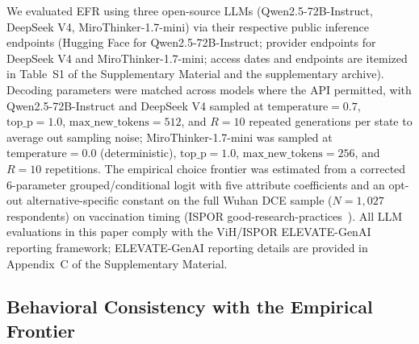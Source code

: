 \documentclass[11pt]{article}
\begin{document}
We evaluated EFR using three open-source LLMs (Qwen2.5-72B-Instruct, DeepSeek V4, MiroThinker-1.7-mini) via their respective public inference endpoints (Hugging Face for Qwen2.5-72B-Instruct; provider endpoints for DeepSeek V4 and MiroThinker-1.7-mini; access dates and endpoints are itemized in Table~S1 of the Supplementary Material and the supplementary archive). Decoding parameters were matched across models where the API permitted, with Qwen2.5-72B-Instruct and DeepSeek V4 sampled at $\mathrm{temperature}=0.7$, $\mathrm{top\_p}=1.0$, $\mathrm{max\_new\_tokens}=512$, and $R=10$ repeated generations per state to average out sampling noise; MiroThinker-1.7-mini was sampled at $\mathrm{temperature}=0.0$ (deterministic), $\mathrm{top\_p}=1.0$, $\mathrm{max\_new\_tokens}=256$, and $R=10$ repetitions. The empirical choice frontier was estimated from a corrected 6-parameter grouped/conditional logit with five attribute coefficients and an opt-out alternative-specific constant on the full Wuhan DCE sample ($N=1{,}027$ respondents) on vaccination timing (ISPOR good-research-practices~\citep{Johnson2013DCE,Hauber2016DCE}). All LLM evaluations in this paper comply with the ViH/ISPOR ELEVATE-GenAI reporting framework; ELEVATE-GenAI reporting details are provided in Appendix~C of the Supplementary Material.

\subsection{Behavioral Consistency with the Empirical Frontier}
\label{sec:behavioral_consistency}
\end{document}

